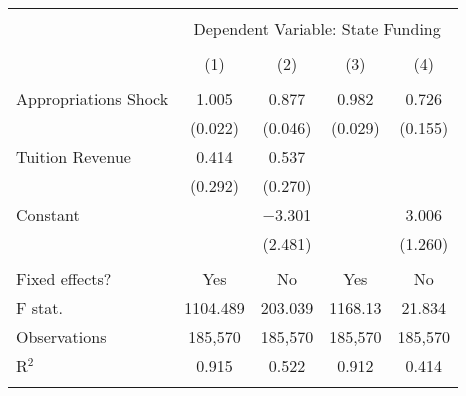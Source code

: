 
\begin{tabular}{@{\extracolsep{5pt}}lcccc} 
\\[-1.8ex]\hline 
\hline \\[-1.8ex] 
 & \multicolumn{4}{c}{Dependent Variable: State Funding} \\ 
\cline{2-5} 
\\[-1.8ex] & (1) & (2) & (3) & (4)\\ 
\hline \\[-1.8ex] 
 Appropriations Shock & 1.005 & 0.877 & 0.982 & 0.726 \\ 
  & (0.022) & (0.046) & (0.029) & (0.155) \\ 
  Tuition Revenue & 0.414 & 0.537 &  &  \\ 
  & (0.292) & (0.270) &  &  \\ 
  Constant &  & $-$3.301 &  & 3.006 \\ 
  &  & (2.481) &  & (1.260) \\ 
 \hline \\[-1.8ex] 
Fixed effects? & Yes & No & Yes & No \\ 
F stat. & 1104.489 & 203.039 & 1168.13 & 21.834 \\ 
Observations & 185,570 & 185,570 & 185,570 & 185,570 \\ 
R$^{2}$ & 0.915 & 0.522 & 0.912 & 0.414 \\ 
\hline 
\hline \\[-1.8ex] 
\end{tabular} 
